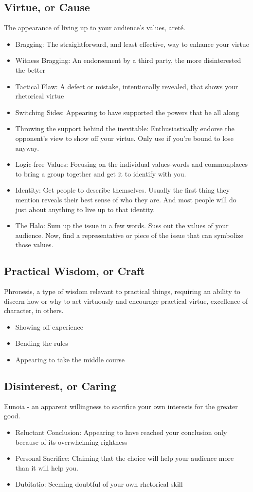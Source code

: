 \subsection{Virtue, or Cause}
The appearance of living up to your audience's values, areté.
\begin{itemize}
	\item Bragging: The straightforward, and least effective, way to enhance your virtue
	\item Witness Bragging: An endorsement by a third party, the more disinterested the better
	\item Tactical Flaw: A defect or mistake, intentionally revealed, that shows your rhetorical virtue
	\item Switching Sides: Appearing to have supported the powers that be all along
	\item Throwing the support behind the inevitable: Enthusiastically endorse the opponent's view to show off your virtue. Only use if you're bound to lose anyway.
	\item Logic-free Values: Focusing on the individual values-words and commonplaces to bring a group together and get it to identify with you.
	\item Identity: Get people to describe themselves. Usually the first thing they mention reveals their best sense of who they are. And most people will do just about anything to live up to that identity.
	\item The Halo: Sum up the issue in a few words. Suss out the values of your audience. Now, find a representative or piece of the issue that can symbolize those values.
\end{itemize}

\subsection{Practical Wisdom, or Craft}
Phronesis, a type of wisdom relevant to practical things, requiring an ability to discern how or why to act virtuously and encourage practical virtue, excellence of character, in others.

\begin{itemize}
	\item Showing off experience
	\item Bending the rules
	\item Appearing to take the middle course
\end{itemize}

\subsection{Disinterest, or Caring}
Eunoia - an apparent willingness to sacrifice your own interests for the greater good.
\begin{itemize}
	\item Reluctant Conclusion: Appearing to have reached your conclusion only because of its overwhelming rightness
	\item Personal Sacrifice: Claiming that the choice will help your audience more than it will help you.
	\item Dubitatio: Seeming doubtful of your own rhetorical skill
\end{itemize}

